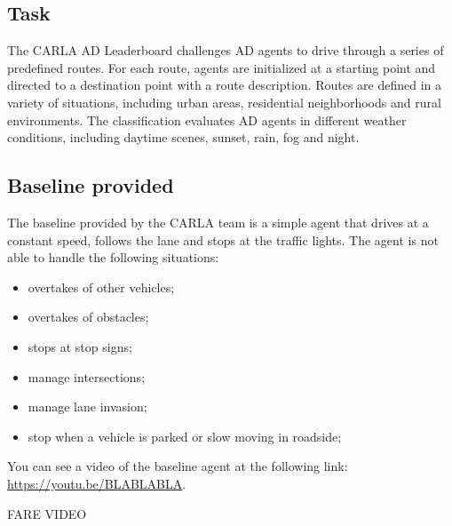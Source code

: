 \documentclass{article}
\begin{document}
\subsection{Task}
The CARLA AD Leaderboard challenges AD agents to drive through a series of predefined routes. For each route, 
agents are initialized at a starting point and directed to a destination point with a route description. 
Routes are defined in a variety of situations, including urban areas, residential neighborhoods and rural environments. 
The classification evaluates AD agents in different weather conditions, including daytime scenes, sunset, rain, fog and night.

\subsection{Baseline provided}
The baseline provided by the CARLA team is a simple agent that drives at a constant speed, follows the lane and stops at the traffic lights.
The agent is not able to handle the following situations:
\begin{itemize}
    \item overtakes of other vehicles;
    \item overtakes of obstacles;
    \item stops at stop signs;
    \item manage intersections;
    \item manage lane invasion;
    \item stop when a vehicle is parked or slow moving in roadside;
\end{itemize}

You can see a video of the baseline agent at the following link: \url{https://youtu.be/BLABLABLA}.

FARE VIDEO
\end{document}
